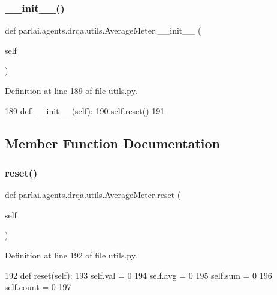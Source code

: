 \subsubsection{\texorpdfstring{\+\_\+\+\_\+init\+\_\+\+\_\+()}{\_\_init\_\_()}}
{\footnotesize\ttfamily def parlai.\+agents.\+drqa.\+utils.\+Average\+Meter.\+\_\+\+\_\+init\+\_\+\+\_\+ (\begin{DoxyParamCaption}\item[{}]{self }\end{DoxyParamCaption})}



Definition at line 189 of file utils.\+py.


\begin{DoxyCode}
189     \textcolor{keyword}{def }\_\_init\_\_(self):
190         self.reset()
191 
\end{DoxyCode}


\subsection{Member Function Documentation}
\mbox{\label{classparlai_1_1agents_1_1drqa_1_1utils_1_1AverageMeter_adf03b2f21b820b30c0bf68334bda0b6e}} 
\subsubsection{\texorpdfstring{reset()}{reset()}}
{\footnotesize\ttfamily def parlai.\+agents.\+drqa.\+utils.\+Average\+Meter.\+reset (\begin{DoxyParamCaption}\item[{}]{self }\end{DoxyParamCaption})}



Definition at line 192 of file utils.\+py.


\begin{DoxyCode}
192     \textcolor{keyword}{def }reset(self):
193         self.val = 0
194         self.avg = 0
195         self.sum = 0
196         self.count = 0
197 
\end{DoxyCode}
\mbox{\label{classparlai_1_1agents_1_1drqa_1_1utils_1_1AverageMeter_a5a66f2a884034fcdf004468a980d1318}} 
